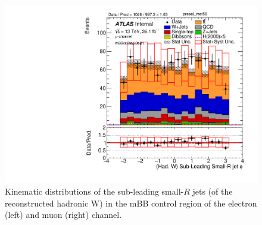\begin{figure}[!ht]
\begin{center}
\includegraphics[scale=0.33]{./figures/boosted/PlotByChannels/DataMC_2tag_0bjet_mbbcr_muon_presel_met50_LightJet2Phi}                                                                               
\caption{Kinematic distributions of the sub-leading small-$R$ jets (of the reconstructed hadronic W) in the mBB control region of the electron (left) 
and muon (right) channel.}
\label{fig:boosted_mbbcrleptons_whad_subleadjets}
\end{center}
\end{figure}


